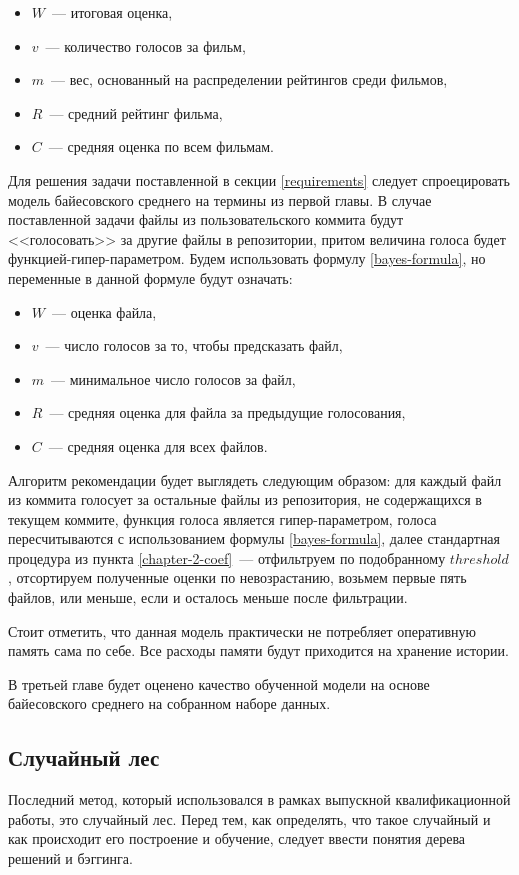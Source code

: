     \begin{itemize}
        \item $W$~--- итоговая оценка,
        \item $v$~--- количество голосов за фильм,
        \item $m$~--- вес, основанный на распределении рейтингов среди фильмов,
        \item $R$~--- средний рейтинг фильма,
        \item ${C}$~--- средняя оценка по всем фильмам.
    \end{itemize}

Для решения задачи поставленной в секции \ref{requirements} следует спроецировать модель байесовского среднего на термины из первой главы. В случае поставленной задачи файлы из пользовательского коммита будут <<голосовать>> за другие файлы в репозитории, притом величина голоса будет функцией-гипер-параметром. Будем использовать формулу \ref{bayes-formula}, но переменные в данной формуле будут означать:
\begin{itemize}
    \item $W$~--- оценка файла,
    \item $v$~--- число голосов за то, чтобы предсказать файл,
    \item $m$~--- минимальное число голосов за файл,
    \item $R$~--- средняя оценка для файла за предыдущие голосования,
    \item ${C}$~--- средняя оценка для всех файлов.
\end{itemize}

Алгоритм рекомендации будет выглядеть следующим образом: для каждый файл из коммита голосует за остальные файлы из репозитория, не содержащихся в текущем коммите, функция голоса является гипер-параметром, голоса пересчитываются с использованием формулы \ref{bayes-formula}, далее стандартная процедура из пункта \ref{chapter-2-coef}~--- отфильтруем по подобранному $threshold$, отсортируем полученные оценки по невозрастанию, возьмем первые пять файлов, или меньше, если и осталось меньше после фильтрации.

Стоит отметить, что данная модель практически не потребляет оперативную память сама по себе. Все расходы памяти будут приходится на хранение истории.

В третьей главе будет оценено качество обученной модели на основе байесовского среднего на собранном наборе данных.
    \subsection{Случайный лес}
Последний метод, который использовался в рамках выпускной квалификационной работы, это случайный лес. Перед тем, как определять, что такое случайный и как происходит его построение и обучение, следует ввести понятия дерева решений и бэггинга.


